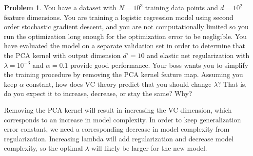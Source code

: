 \documentclass[10pt]{exam}
\theoremstyle{definition}
\newtheorem{problem}{Problem}
\begin{document}
\newpage
\begin{problem}
    You have a dataset with $N=10^3$ training data points and $d=10^2$ feature dimensions.
    You are training a logistic regression model using second order stochastic gradient descent,
    and you are not computationally limited so you run the optimization long enough for the optimization error to be negligible.
    You have evaluated the model on a separate validation set in order to determine that the PCA kernel with output dimension $d'=10$ and elastic net regularization with $\lambda=10^{-3}$ and $\alpha=0.1$ provide good performance.
    Your boss wants you to simplify the training procedure by removing the PCA kernel feature map.
    Assuming you keep $\alpha$ constant, how does VC theory predict that you should change $\lambda$?
    That is, do you expect it to increase, decrease, or stay the same?
    Why?
\end{problem}
\begin{solution}
    Removing the PCA kernel will result in increasing the VC dimension, which corresponds to an increase in model complexity.
    In order to keep generalization error constant,
    we need a corresponding decrease in model complexity from regularization.
    Increasing lambda will add regularization and decrease model complexity, so the optimal $\lambda$ will likely be larger for the new model.

\end{solution}
\end{document}
